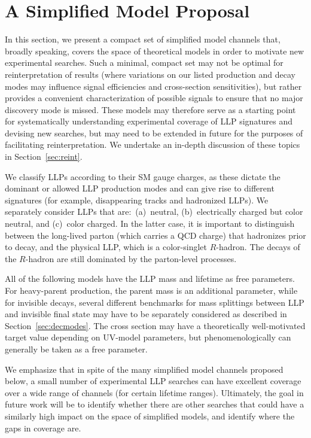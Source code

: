 \section{A Simplified Model Proposal}\label{sec:proposal}

In this section, we present a compact set of simplified model channels that, broadly speaking, covers the space of theoretical models in order to motivate new experimental searches. Such a minimal, compact set may not be optimal for reinterpretation of results (where variations on our listed production and decay modes may influence signal efficiencies and cross-section sensitivities), but rather provides a convenient characterization of possible signals to ensure that no major discovery mode is missed. These models may therefore serve as a starting point for systematically understanding experimental coverage of LLP signatures and devising new searches, but may need to be extended in future for the purposes of facilitating reinterpretation. We undertake an in-depth discussion of these topics in  Section~\ref{sec:reint}.

We classify LLPs according to their SM gauge charges, as these dictate
the dominant or allowed LLP production modes and can give rise
to different signatures (for example, disappearing tracks and
hadronized LLPs). We separately consider LLPs that 
are:~(a)~neutral, (b)~electrically
charged but color neutral, and (c)~color charged. In the latter case,
it is important to distinguish between the long-lived parton (which carries a QCD charge)
that hadronizes prior to decay,
and the physical LLP, which is a color-singlet $R$-hadron. The decays of the $R$-hadron are 
still dominated by the parton-level processes.

All of the following models have the LLP mass and lifetime as free parameters. For heavy-parent production, the parent mass is an additional parameter, while for invisible decays, several different benchmarks for mass splittings between LLP and invisible final state may have to be separately considered as described in Section~\ref{sec:decmodes}. The cross section may have  a theoretically well-motivated target value depending on  UV-model parameters, but phenomenologically can generally be taken as a free parameter.

We emphasize that in spite of the many simplified model
channels proposed below, a small number of experimental LLP searches can
have excellent coverage over a wide range of channels (for certain lifetime ranges). Ultimately, the goal in future work will be
to  identify whether there are other searches that could
have a similarly high impact on the space of simplified models, and  identify where the gaps in coverage are.

